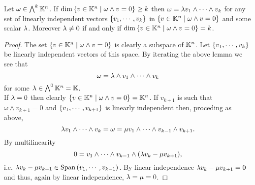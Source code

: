 \begin{corollary}\label{TotalDecomposibilityCriterion}
Let $\omega\in \bigwedge^k\mathbb{K}^n$. If $\dim\left\{{v\in\mathbb{K}^n\mid \omega\wedge v=0}\right\}\geq k$ then $\omega=\lambda v_1\wedge \cdots\wedge v_k$ for any set of linearly independent vectors $\left\{{v_1,\cdots, v_k}\right\}$ in $\left\{{v\in\mathbb{K}^n\mid \omega\wedge v=0}\right\}$ and some scalar $\lambda$. Moreover $\lambda\neq 0$ if and only if $\dim\left\{{v\in\mathbb{K}^n\mid \omega\wedge v=0}\right\}= k$.
\end{corollary}
\begin{proof}
The set $\left\{{v\in\mathbb{K}^n\mid \omega\wedge v=0}\right\}$ is clearly a subspace of $\mathbb{K}^n$. Let $\left\{{v_1,\cdots, v_k}\right\}$ be linearly independent vectors of this space. By iterating the above lemma we see that
\[\omega=\lambda\wedge v_1\wedge\cdots\wedge v_k\]
for some $\lambda\in \bigwedge^0\mathbb{K}^n=\mathbb{K}$.\\
If $\lambda=0$ then clearly $\left\{{v\in\mathbb{K}^n\mid \omega\wedge v=0}\right\}=\mathbb{K}^n$. If $v_{k+1}$ is such that $\omega\wedge v_{k+1}=0$ and $\left\{{v_1,\cdots, v_{k+1}}\right\}$ is linearly independent then, proceding as above,
\[\lambda v_1\wedge\cdots\wedge v_{k}=\omega=\mu v_1\wedge\cdots\wedge v_{k-1}\wedge v_{k+1}.\]
By multilinearity
\[0=v_1\wedge\cdots\wedge v_{k-1}\wedge(\lambda v_k-\mu v_{k+1}),\]
i.e. $\lambda v_k-\mu v_{k+1}\in \mathrm{Span}\,(v_1,\cdots, v_{k-1})$. By linear independence $\lambda v_k-\mu v_{k+1}=0$ and thus, again by linear independence, $\lambda=\mu=0$.
\end{proof}



